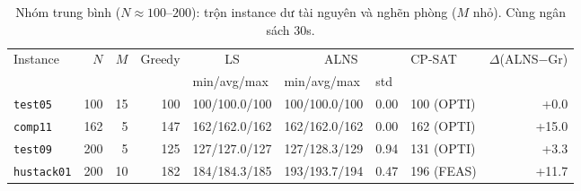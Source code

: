 \begin{table}[H]
\centering\small
\caption{Nhóm trung bình ($N\approx 100$--$200$): trộn instance dư tài nguyên và nghẽn phòng ($M$ nhỏ). Cùng ngân sách $30$s.}
\label{tab:bench-medium}
\begin{tabular}{lrr r l ll l r}
\toprule
\multirow{2}{*}{Instance} & \multirow{2}{*}{$N$} & \multirow{2}{*}{$M$}
& \multirow{2}{*}{Greedy}
& \multicolumn{1}{c}{LS} & \multicolumn{2}{c}{ALNS} & \multirow{2}{*}{CP-SAT}
& \multirow{2}{*}{$\Delta$(ALNS$-$Gr)} \\
\cmidrule(lr){5-5}\cmidrule(lr){6-7}
& & & & min/avg/max & min/avg/max & std & & \\
\midrule
\texttt{test05} & 100 & 15 & 100 & 100/100.0/100 & 100/100.0/100 & 0.00 & 100 (OPTI) & +0.0 \\
\texttt{comp11} & 162 & 5 & 147 & 162/162.0/162 & 162/162.0/162 & 0.00 & 162 (OPTI) & +15.0 \\
\texttt{test09} & 200 & 5 & 125 & 127/127.0/127 & 127/128.3/129 & 0.94 & 131 (OPTI) & +3.3 \\
\texttt{hustack01} & 200 & 10 & 182 & 184/184.3/185 & 193/193.7/194 & 0.47 & 196 (FEAS) & +11.7 \\
\bottomrule
\end{tabular}
\end{table}
